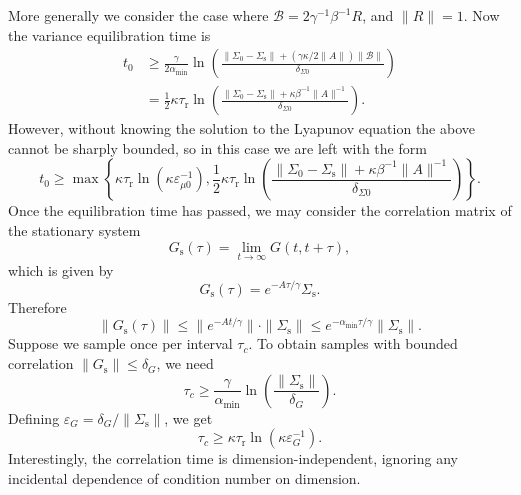 \documentclass[prx,onecolumn,floatfix,longbibliography,notitlepage, nofootinbib,12pt]{revtex4-2}
\renewcommand{\geq}{\geqslant}
\renewcommand{\leq}{\leqslant}
\begin{document}
\begin{appendix}
More generally we consider the case where $\mathcal{B} = 2 \gamma^{-1} \beta^{-1} R$, and $\|R\|=1$. Now the variance equilibration time is
\begin{align}
t_0  & \geq  \frac{\gamma}{2 \alpha_\text{min}}\ln\left(\frac{\|\Sigma_0 - \Sigma_\text{s}\| + (\gamma \kappa / 2\|A\|)\|\mathcal{B}\|}{\delta_{\Sigma 0}}\right)\\
&= \frac{1}{2}\kappa\tau_\text{r}\ln\left(\frac{\|\Sigma_0 - \Sigma_\text{s}\| + \kappa \beta^{-1} \|A\|^{-1}
}{\delta_{\Sigma 0}}\right)
.
\end{align}
However, without knowing the solution to the Lyapunov equation the above cannot be sharply bounded, so in this case we are left with the form
\begin{equation}
t_0 \geq \max \left\{\kappa \tau_\text{r}\ln \left(\kappa \varepsilon^{-1}_{\mu 0}\right),\frac{1}{2}\kappa\tau_\text{r}\ln\left(\frac{\|\Sigma_0 - \Sigma_\text{s}\| + \kappa \beta^{-1} \|A\|^{-1}
}{\delta_{\Sigma 0}}\right)
\right\}.
\end{equation}
Once the equilibration time has passed, we may consider the correlation matrix of the stationary system
\begin{equation}
    G_\text{s}(\tau) = \lim_{t \to \infty} G(t, t+\tau),
\end{equation}
which is given by 
\begin{equation}
    G_\text{s}(\tau) = e^{-A \tau/\gamma} \Sigma_\text{s}.
\end{equation}
Therefore
\begin{equation}
    \|G_\text{s}(\tau)\| \leq \|e^{-A t/\gamma}\| \cdot \|\Sigma_\text{s}\| \leq e^{- \alpha_\text{min} \tau/\gamma}  \left\|\Sigma_\text{s}\right\|.
\end{equation}
Suppose we sample once per interval $\tau_c$. To obtain samples with bounded correlation $\left\| G_\text{s} \right \| \leq \delta_G $, we need
\begin{equation}
    \tau_c \geq \frac{\gamma}{\alpha_\text{min}} \ln \left(\frac{\|\Sigma_\text{s}\|}{\delta_G}\right).
\end{equation}
Defining $\varepsilon_G = \delta_G/\|\Sigma_\text{s}\|$, we get
\begin{equation}
    \tau_c \geq\kappa \tau_\text{r} \ln \left(\kappa \varepsilon_G^{-1}\right).
\end{equation}
Interestingly, the correlation time is dimension-independent, ignoring any incidental dependence of condition number on dimension.



\end{appendix}
\end{document}
